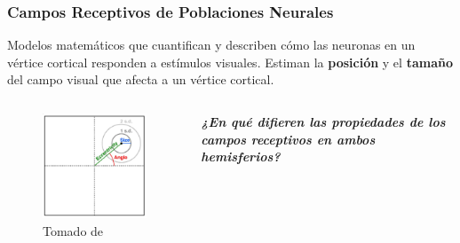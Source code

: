 \documentclass[
11pt, %
%
aspectratio=169, %
]{beamer}
\begin{document}
\begin{frame}
	\frametitle{Campos Receptivos de Poblaciones Neurales}
	
	\begin{block}{}
		Modelos matemáticos que cuantifican y describen cómo las neuronas en un v\'ertice cortical responden a estímulos visuales. Estiman la \textbf{posición} y el \textbf{tamaño} del campo visual que afecta a un v\'ertice cortical.
	\end{block}
	
	\begin{columns}
		
		\begin{column}{0.5\textwidth}
			\begin{figure}
				\centering
				\captionsetup{font=tiny}
				\includegraphics[scale=0.45]{Graphics/pRF2}
				\caption{Tomado de \cite{benson_human_2018}}
			\end{figure}
		\end{column}
		
		\begin{column}{0.5\textwidth} %
				\centering
			\textbf{\textit{¿En qu\'e difieren las propiedades de los campos receptivos en ambos hemisferios?}}
			
		\end{column}					
		
	\end{columns}
	
	
	
\end{frame}
\end{document}
